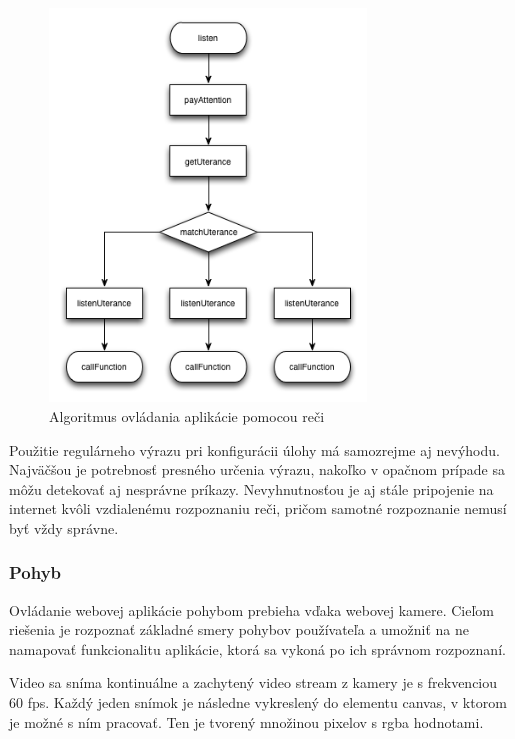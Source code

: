 \begin{figure}[H]
  \centering
  \includegraphics[width=0.75\textwidth]{diagram/speech.png}
  \caption[Algoritmus ovládania aplikácie pomocou reči]{
    Algoritmus ovládania aplikácie pomocou reči}
  \label{fig: diaspeech}
\end{figure}

Použitie regulárneho výrazu pri konfigurácii úlohy má samozrejme aj nevýhodu. Najväčšou je potrebnosť presného určenia výrazu, nakoľko v opačnom prípade sa môžu detekovať aj nesprávne príkazy. Nevyhnutnosťou je aj stále pripojenie na internet kvôli vzdialenému rozpoznaniu reči, pričom samotné rozpoznanie nemusí byť vždy správne.


\subsubsection{Pohyb} %
\label{ssub:pohyb}

Ovládanie webovej aplikácie pohybom prebieha vďaka webovej kamere. Cieľom riešenia je rozpoznať základné smery pohybov používateľa a umožniť na ne namapovať funkcionalitu aplikácie, ktorá sa vykoná po ich správnom rozpoznaní. 

Video sa sníma kontinuálne a zachytený video stream z kamery je s frekvenciou 60 fps. Každý jeden snímok je následne vykreslený do elementu canvas, v ktorom je možné s ním pracovať. Ten je tvorený množinou pixelov s rgba hodnotami.

